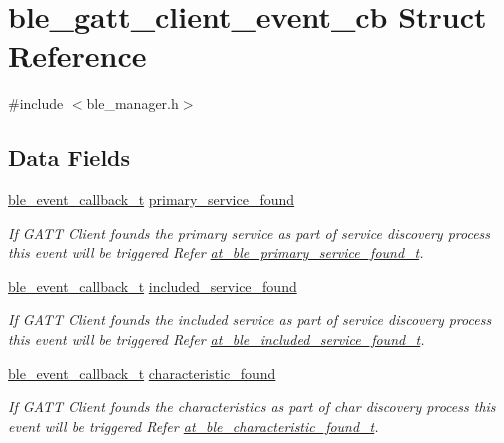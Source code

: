\hypertarget{structble__gatt__client__event__cb}{}\section{ble\+\_\+gatt\+\_\+client\+\_\+event\+\_\+cb Struct Reference}
\label{structble__gatt__client__event__cb}


{\ttfamily \#include $<$ble\+\_\+manager.\+h$>$}

\subsection*{Data Fields}
\begin{DoxyCompactItemize}
\item 
\mbox{\hyperlink{ble__manager_8h_a04ce4bb8cb8282f2762e3924b1773cc9}{ble\+\_\+event\+\_\+callback\+\_\+t}} \mbox{\hyperlink{structble__gatt__client__event__cb_a4cfebad7f0221c03c06419f5d1b972d4}{primary\+\_\+service\+\_\+found}}
\begin{DoxyCompactList}\small\item\em If G\+A\+TT Client founds the primary service as part of service discovery process this event will be triggered Refer \mbox{\hyperlink{structat__ble__primary__service__found__t}{at\+\_\+ble\+\_\+primary\+\_\+service\+\_\+found\+\_\+t}}. \end{DoxyCompactList}\item 
\mbox{\hyperlink{ble__manager_8h_a04ce4bb8cb8282f2762e3924b1773cc9}{ble\+\_\+event\+\_\+callback\+\_\+t}} \mbox{\hyperlink{structble__gatt__client__event__cb_a4436e1c9a54d9c532281ca67c28827f8}{included\+\_\+service\+\_\+found}}
\begin{DoxyCompactList}\small\item\em If G\+A\+TT Client founds the included service as part of service discovery process this event will be triggered Refer \mbox{\hyperlink{structat__ble__included__service__found__t}{at\+\_\+ble\+\_\+included\+\_\+service\+\_\+found\+\_\+t}}. \end{DoxyCompactList}\item 
\mbox{\hyperlink{ble__manager_8h_a04ce4bb8cb8282f2762e3924b1773cc9}{ble\+\_\+event\+\_\+callback\+\_\+t}} \mbox{\hyperlink{structble__gatt__client__event__cb_aed7efe1ec5c627556016aebdef73a002}{characteristic\+\_\+found}}
\begin{DoxyCompactList}\small\item\em If G\+A\+TT Client founds the characteristics as part of char discovery process this event will be triggered Refer \mbox{\hyperlink{structat__ble__characteristic__found__t}{at\+\_\+ble\+\_\+characteristic\+\_\+found\+\_\+t}}. \end{DoxyCompactList}\item 

\end{DoxyCompactItemize}
